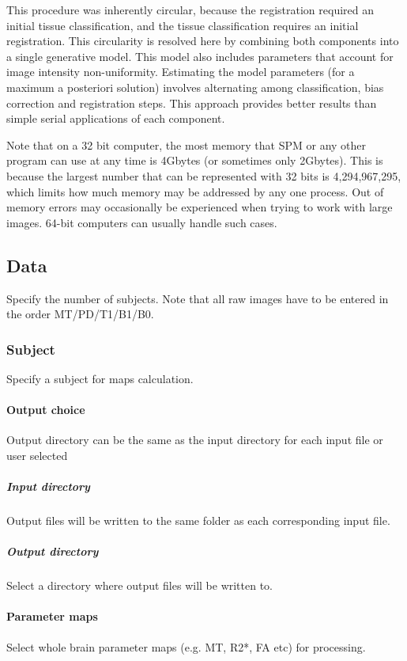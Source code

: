 This procedure was inherently circular, because the registration required an initial tissue classification, and the tissue classification requires an initial registration.  This circularity is resolved here by combining both components into a single generative model. This model also includes parameters that account for image intensity non-uniformity. Estimating the model parameters (for a maximum a posteriori solution) involves alternating among classification, bias correction and registration steps. This approach provides better results than simple serial applications of each component.



Note that on a 32 bit computer, the most memory that SPM or any other program can use at any time is 4Gbytes (or sometimes only 2Gbytes).  This is because the largest number that can be represented with 32 bits is 4,294,967,295, which limits how much memory may be addressed by any one process.  Out of memory errors may occasionally be experienced when trying to work with large images.  64-bit computers can usually handle such cases.


\subsection{Data}
Specify the number of subjects. Note that all raw images have to be entered in the order MT/PD/T1/B1/B0.


\subsubsection{Subject}
Specify a subject for maps calculation.


\paragraph{Output choice}
Output directory can be the same as the input directory for each input file or user selected


\subparagraph{Input directory}
Output files will be written to the same folder as each corresponding input file.


\subparagraph{Output directory}
Select a directory where output files will be written to.


\paragraph{Parameter maps}
Select whole brain parameter maps (e.g. MT, R2*, FA etc) for processing.


